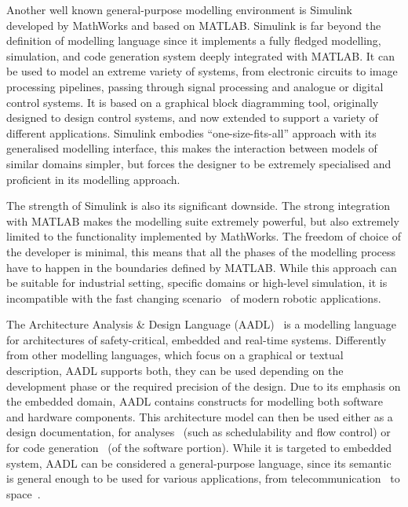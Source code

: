 Another well known general-purpose modelling environment is Simulink~\cite{dabney2004mastering} developed by MathWorks and based on MATLAB. Simulink is far beyond the definition of modelling language since it implements a fully fledged modelling, simulation, and code generation system deeply integrated with MATLAB. It can be used to model an extreme variety of systems, from electronic circuits to image processing pipelines, passing through signal processing and analogue or digital control systems. It is based on a graphical block diagramming tool, originally designed to design control systems, and now extended to support a variety of different applications. Simulink embodies ``one-size-fits-all'' approach with its generalised modelling interface, this makes the interaction between models of similar domains simpler, but forces the designer to be extremely specialised and proficient in its modelling approach.

The strength of Simulink is also its significant downside. The strong integration with MATLAB makes the modelling suite extremely powerful, but also extremely limited to the functionality implemented by MathWorks. The freedom of choice of the developer is minimal, this means that all the phases of the modelling process have to happen in the boundaries defined by MATLAB. While this approach can be suitable for industrial setting, specific domains or high-level simulation, it is incompatible with the fast changing scenario~\cite{cousins2011exponential} of modern robotic applications.

The  Architecture Analysis \& Design Language (AADL)~\cite{feiler2006architecture} is a modelling language for architectures of safety-critical, embedded and real-time systems. Differently from other modelling languages, which focus on a graphical or textual description, AADL supports both, they can be used depending on the development phase or the required precision of the design. Due to its emphasis on the embedded domain, AADL contains constructs for modelling both software and hardware components. This architecture model can then be used either as a design documentation, for analyses~\cite{feiler2004open} (such as schedulability and flow control) or for code generation~\cite{hugues2008prototype} (of the software portion). While it is targeted to embedded system, AADL can be considered a general-purpose language, since its semantic is general enough to be used for various applications, from telecommunication~\cite{delanote2008using} to space~\cite{perrotin2011taste}.


